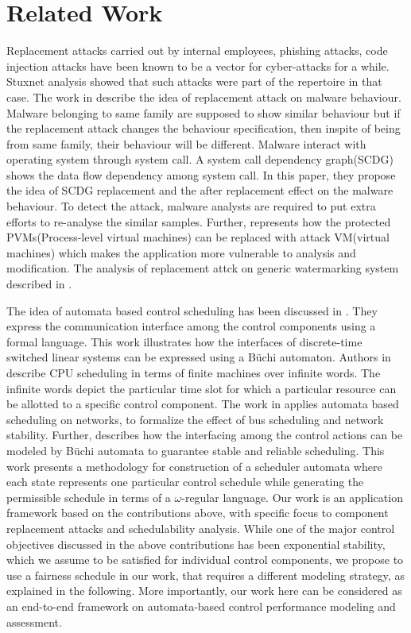 \section{Related Work} \label{sec2}
Replacement attacks \cite{GhoshHD12} carried out by internal employees, phishing attacks, code injection attacks have been known to be a vector for cyber-attacks for a while. Stuxnet analysis showed that such
attacks were part of the repertoire in that case.  The work in \cite{DBLP:conf/acns/MingXLW0M15} %
describe the idea of replacement attack on malware behaviour. Malware belonging to
same family are supposed to show similar behaviour but 
  if the replacement  attack changes the behaviour specification, then inspite of being from same family, their behaviour will be different. Malware
  interact with operating system through system call. A system call dependency graph(SCDG) shows the data flow dependency among system call. In this paper,
  they propose the idea of SCDG replacement and the after replacement effect on the malware behaviour. To detect the attack, malware analysts are required 
  to put extra efforts to re-analyse the similar samples. Further,  \cite{DBLP:conf/vee/GhoshHD12} represents how the protected PVMs(Process-level virtual machines) can be replaced with attack VM(virtual
  machines) which makes the application more vulnerable to analysis and modification. The analysis of  replacement attck on generic watermarking system described in \cite{DBLP:conf/ccs/KirovskiP02}. 

The idea of automata based control scheduling has been discussed in \cite{WeissA07}. They express
the communication interface among the control components using a formal language. This work illustrates how the interfaces of discrete-time switched linear systems
can be expressed using a B\"{u}chi automaton. Authors in \cite{AlurW08}  describe CPU scheduling
in terms of finite machines over infinite words. The infinite words depict the particular time 
slot for which a particular resource can be allotted to a specific control component. The work in \cite{WeissFAA09} applies automata based scheduling on networks, to formalize the effect of bus scheduling and network stability. Further, \cite{GhoshMDHD16} describes how the interfacing among 
the control actions can be modeled by B\"{u}chi automata to guarantee stable and reliable
scheduling. This work presents a methodology for construction of a scheduler automata 
where each state represents one particular control schedule while generating the permissible 
schedule in terms of a $\omega$-regular language. Our work is an application framework based on the contributions above, with specific focus to component replacement attacks and schedulability analysis. While one of the major control objectives discussed in the above contributions has been exponential stability, which we assume to be satisfied for individual control components, we propose to use a fairness schedule in our work, that requires a different modeling strategy, as explained in the following. More importantly, our work here can be considered as an end-to-end framework on automata-based control performance modeling and assessment. \\
  
 
  
